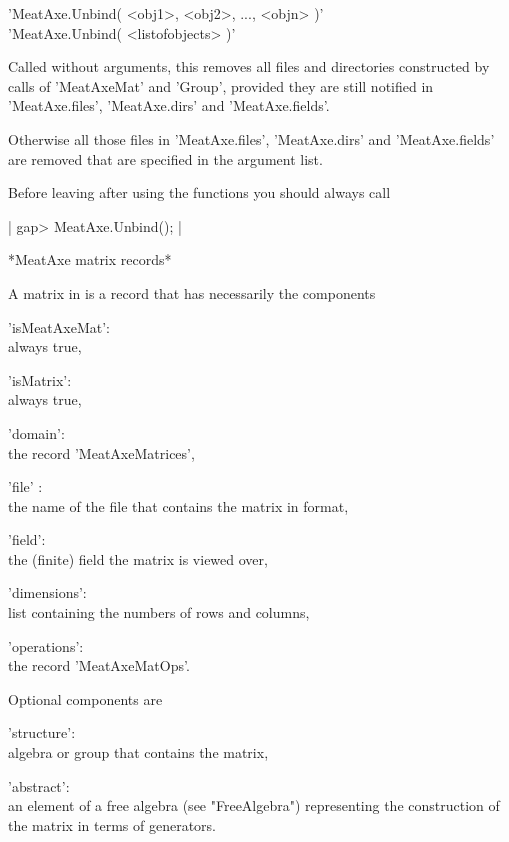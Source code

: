 
'MeatAxe.Unbind( <obj1>, <obj2>, ..., <objn> )'\\
'MeatAxe.Unbind( <listofobjects> )'

Called without arguments, this removes all files and directories
constructed by calls of 'MeatAxeMat' and 'Group', provided they are still
notified in 'MeatAxe.files', 'MeatAxe.dirs' and 'MeatAxe.fields'.

Otherwise all those files in 'MeatAxe.files', 'MeatAxe.dirs' and
'MeatAxe.fields' are removed that are specified in the argument list.

Before leaving {\GAP} after using the {\MeatAxe} functions
you should always call

|    gap> MeatAxe.Unbind(); |


*MeatAxe matrix records*

A {\MeatAxe} matrix in {\GAP} is a record that has necessarily the components

'isMeatAxeMat':\\ always true,

'isMatrix':\\   always true,

'domain':\\     the record 'MeatAxeMatrices',

'file' :\\      the name of the file that contains the matrix in {\MeatAxe}
                format,

'field':\\      the (finite) field the matrix is viewed over,

'dimensions':\\ list containing the numbers of rows and columns,

'operations':\\ the record 'MeatAxeMatOps'.

Optional components are

'structure':\\ algebra or group that contains the matrix,

'abstract':\\  an element of a free algebra (see "FreeAlgebra")
               representing the construction of the matrix in terms of
               generators.

